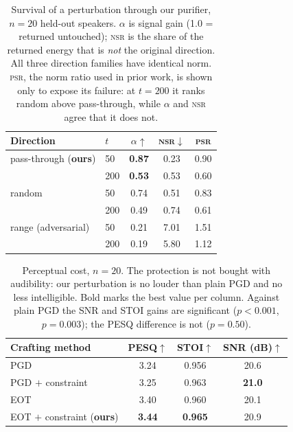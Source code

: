 \begin{table}[t]
\centering
\caption{Survival of a perturbation through our purifier, $n=20$ held-out
speakers. $\alpha$ is signal gain (1.0 = returned untouched); \textsc{nsr} is the
share of the returned energy that is \emph{not} the original direction. All three
direction families have identical norm. \textsc{psr}, the norm ratio used in prior
work, is shown only to expose its failure: at $t{=}200$ it ranks random above
pass-through, while $\alpha$ and \textsc{nsr} agree that it does not.}
\label{tab:survival}
\small
\begin{tabular}{llccc}
\toprule
Direction & $t$ & $\alpha\uparrow$ & \textsc{nsr}$\downarrow$ & \textsc{psr} \\
\midrule
pass-through (\textbf{ours}) & 50 & \textbf{0.87} & 0.23 & 0.90 \\
 & 200 & \textbf{0.53} & 0.53 & 0.60 \\
\addlinespace
random & 50 & 0.74 & 0.51 & 0.83 \\
 & 200 & 0.49 & 0.74 & 0.61 \\
\addlinespace
range (adversarial) & 50 & 0.21 & 7.01 & 1.51 \\
 & 200 & 0.19 & 5.80 & 1.12 \\
\bottomrule
\end{tabular}
\end{table}

\begin{table}[t]
\centering
\caption{Perceptual cost, $n=20$. The protection is not bought with audibility:
our perturbation is no louder than plain PGD and no less intelligible. Bold marks
the best value per column. Against plain PGD the SNR and STOI gains are significant
($p<0.001$, $p=0.003$); the PESQ difference is not ($p=0.50$).}
\label{tab:perceptual}
\small
\begin{tabular}{lccc}
\toprule
Crafting method & PESQ$\uparrow$ & STOI$\uparrow$ & SNR (dB)$\uparrow$ \\
\midrule
PGD & 3.24 & 0.956 & 20.6 \\
PGD $+$ constraint & 3.25 & 0.963 & \textbf{21.0} \\
EOT & 3.40 & 0.960 & 20.1 \\
EOT $+$ constraint (\textbf{ours}) & \textbf{3.44} & \textbf{0.965} & 20.9 \\
\bottomrule
\end{tabular}
\end{table}

